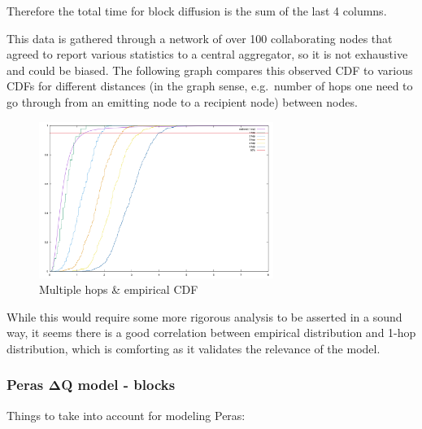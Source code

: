 \documentclass[10pt]{article}
\begin{document}
Therefore the total time for block diffusion is the sum of the last 4
columns.

This data is gathered through a network of over 100 collaborating nodes
that agreed to report various statistics to a central aggregator, so it
is not exhaustive and could be biased. The following graph compares this
observed CDF to various CDFs for different distances (in the graph
sense, e.g.~number of hops one need to go through from an emitting node
to a recipient node) between nodes.

\begin{figure}
\centering
\includegraphics[width=0.68\textwidth]{../diagrams/plot-praos-multi-hops.png}
\caption{Multiple hops \& empirical CDF}
\end{figure}

While this would require some more rigorous analysis to be asserted in a
sound way, it seems there is a good correlation between empirical
distribution and 1-hop distribution, which is comforting as it validates
the relevance of the model.

\subsubsection{Peras ΔQ model -
blocks}\label{peras-ux3b4q-model---blocks}

Things to take into account for modeling Peras:
\end{document}
